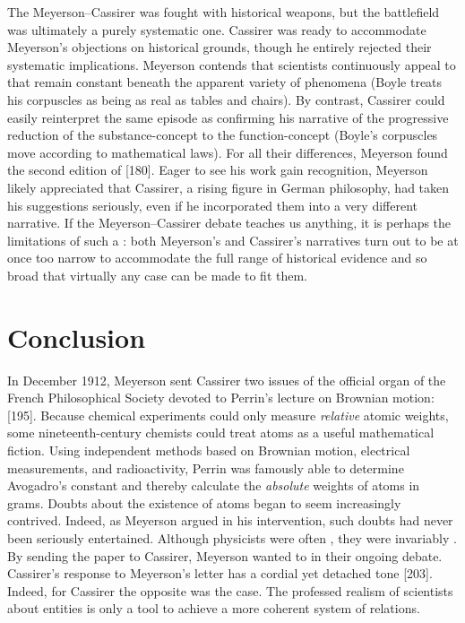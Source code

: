 \documentclass[submitted,12pt]{article}
\begin{document}
The Meyerson--Cassirer  was fought with historical weapons, but the battlefield was ultimately a purely systematic one. Cassirer was ready to accommodate Meyerson’s objections on historical grounds, though he entirely rejected their systematic implications. Meyerson contends that scientists continuously appeal to  that remain constant beneath the apparent variety of phenomena (Boyle treats his corpuscles as being as real as tables and chairs). By contrast, Cassirer could easily reinterpret the same episode as confirming his narrative of the progressive reduction of the substance-concept to the function-concept (Boyle's corpuscles move according to mathematical laws). For all their differences, Meyerson found the second edition of \EPt {} [180]. Eager to see his work gain recognition, Meyerson likely appreciated that Cassirer, a rising figure in German philosophy, had taken his suggestions seriously, even if he incorporated them into a very different narrative. If the Meyerson--Cassirer debate teaches us anything, it is perhaps the limitations of such a : both Meyerson's and Cassirer's narratives turn out to be at once too narrow to accommodate the full range of historical evidence and so broad that virtually any case can be made to fit them.

\section*{Conclusion}
%
In December 1912, Meyerson sent Cassirer two issues of the official organ of the French Philosophical Society devoted to Perrin’s lecture on Brownian motion:  [195]. Because chemical experiments could only measure \emph{relative} atomic weights, some nineteenth-century chemists could treat atoms as a useful mathematical fiction. Using independent methods based on Brownian motion, electrical measurements, and radioactivity, Perrin was famously able to determine Avogadro's constant \citep[281]{Perrin1910} and thereby calculate the \emph{absolute} weights of atoms in grams. Doubts about the existence of atoms began to seem increasingly contrived. Indeed, as Meyerson argued in his intervention, such doubts had never been seriously entertained. Although physicists were often , they were invariably .  By sending the paper to Cassirer, Meyerson wanted to  in their ongoing debate. Cassirer’s response to Meyerson’s letter has a cordial yet detached tone [203]. Indeed, for Cassirer the opposite was the case. The professed realism of scientists about  entities is only a tool to achieve a more coherent system of  relations.
\end{document}
